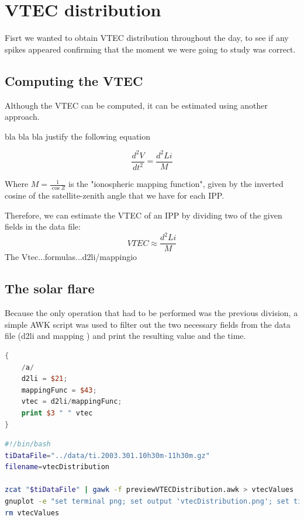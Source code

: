 \section{VTEC distribution}

Fisrt we wanted to obtain VTEC distribution throughout the day, to see if any spikes appeared confirming that the moment we were going to study was correct.



\subsection{Computing the VTEC}

Although the VTEC can be computed, it can be estimated using another approach.

bla bla bla justify the following equation

\begin{equation} \label{eq:1}
	\frac{d^{2}V}{dt^{2}} = \frac{d^{2}Li}{M}
\end{equation}

Where $M=\frac{1}{\cos Z}$ is the "ionospheric mapping function", given by the inverted cosine of the satellite-zenith angle that we have for each IPP. \cite{hernandez2012gnss}

Therefore, we can estimate the VTEC of an IPP by dividing two of the given fields in the data file:
\begin{equation} \label{eq:2}
	VTEC \approx \frac{d^{2}Li}{M}
\end{equation}
The Vtec...formulas...d2li/mappingio


\subsection{The solar flare}

Because the only operation that had to be performed was the previous division, a simple AWK script was used to filter out the two necessary fields from the data file (d2li and  mapping ) and print the resulting value and the time. 

\begin{lstlisting}[language=Awk, caption=process]
{
	/a/
	d2li = $21;
	mappingFunc = $43;
	vtec = d2li/mappingFunc;
	print $3 " " vtec
}
\end{lstlisting}

\begin{lstlisting}[language=Bash, caption=Bash script to execute the procedures]
#!/bin/bash
tiDataFile="../data/ti.2003.301.10h30m-11h30m.gz"
filename=vtecDistribution

zcat "$tiDataFile" | gawk -f previewVTECDistribution.awk > vtecValues
gnuplot -e "set terminal png; set output 'vtecDistribution.png'; set title 'VTEC Distribution'; set xlabel 'Time of the day (hours)'; set ylabel 'VTEC'; set grid; plot \"vtecValues\" using 1:2 with point"
rm vtecValues
\end{lstlisting}
\clearpage

